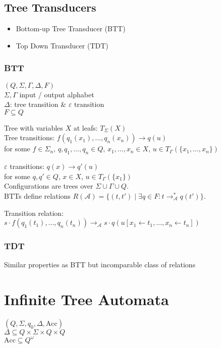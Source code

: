 \documentclass{article}
\begin{document}
\subsection{Tree Transducers}
\begin{itemize}
	\item Bottom-up Tree Transducer (BTT)
	\item Top Down Transducer (TDT)
\end{itemize}

\subsubsection*{BTT}
$(Q, \Sigma, \Gamma, \Delta, F)$ \\
$\Sigma, \Gamma$ input / output alphabet \\
$\Delta$: tree transition \& $\varepsilon$ transition \\
$F \subseteq Q$ 

Tree with variables $X$ at leafs: $T_\Sigma(X)$ \\

Tree transitions: $f(q_1(x_1), \dots, q_n(x_n)) \rightarrow q(u)$ \\
for some $f \in \Sigma_n$, $q, q_1, \dots, q_n \in Q$, $x_1, \dots, x_n \in X$, $u \in T_\Gamma(\{x_1, \dots, x_n\})$

$\varepsilon$ transitions: $q(x) \rightarrow q'(u)$ \\
for some $q, q' \in Q$, $x \in X$, $u \in T_\Gamma(\{x_1\})$ \\

Configurations are trees over $\Sigma \cup \Gamma \cup Q$. \\
BTTs define relations $R(\mathcal{A}) = \{ (t, t') \mid \exists q \in F: t \rightarrow_\mathcal{A}^* q(t')\}$.

Transition relation: $s \cdot f(q_1(t_1), \dots, q_n(t_n)) \rightarrow_\mathcal{A} s \cdot q(u[x_1 \leftarrow t_1, \dots, x_n \leftarrow t_n])$

\subsubsection*{TDT}
Similar properties as BTT but incomparable class of relations




\newpage
\section{Infinite Tree Automata}
$(Q, \Sigma, q_0, \Delta, \text{Acc})$ \\
$\Delta \subseteq Q \times \Sigma \times Q \times Q$ \\
$\text{Acc} \subseteq Q^\omega$
\end{document}
